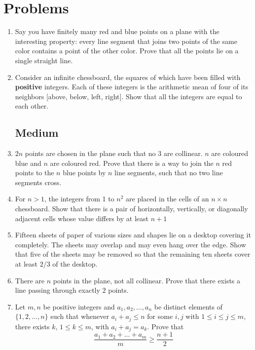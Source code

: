 \documentclass[12pt]{article}
\begin{document}
\section{Problems}

\begin{enumerate}
	\subsection*{Easy}
	\item{Say you have finitely many red and blue points on a plane with the interesting property: every line segment that joins two points of the same color contains a point of the other color. Prove that all the points lie on a single straight line.}
	
	\item{Consider an infinite chessboard, the squares of which have been filled with \textbf{positive} integers. Each of these integers is the arithmetic mean of four of its neighbors [above, below, left, right]. Show that all the integers are equal to each other.}
	
	\subsection*{Medium}
	\item{$2n$ points are chosen in the plane such that no $3$ are collinear. $n$ are coloured blue and $n$ are coloured red. Prove that there is a way to join the $n$ red points to the $n$ blue points by $n$ line segments, such that no two line segments cross.}
	
	\item{For $n>1$, the integers from 1 to $n^2$ are placed in the cells of an $n\times n$ chessboard. Show that there is a pair of horizontally, vertically, or diagonally adjacent cells whose value differs by at least $n+1$}
	
	\item{Fifteen sheets of paper of various sizes and shapes lie on a desktop covering it completely. The sheets may overlap and may even hang over the edge. Show that five of the sheets may be removed so that the remaining ten sheets cover at least $2/3$ of the desktop.}
	
	\item{There are $n$ points in the plane, not all collinear. Prove that there exists a line passing through exactly $2$ points.}
	
	\item{Let $m, n$ be positive integers and $a_1, a_2, ..., a_n$ be distinct elements of $\{1, 2, ..., n\}$ such that whenever $a_i + a_j \le n$ for some $i, j$ with $1\le i\le j\le m$, there exists $k$, $1 \le k \le m$, with $a_i + a_j = a_k$. Prove that
	\[\dfrac{a_1 + a_2 + ... + a_m}{m} \ge \dfrac{n+1}{2}\]}


\end{enumerate}
\end{document}
